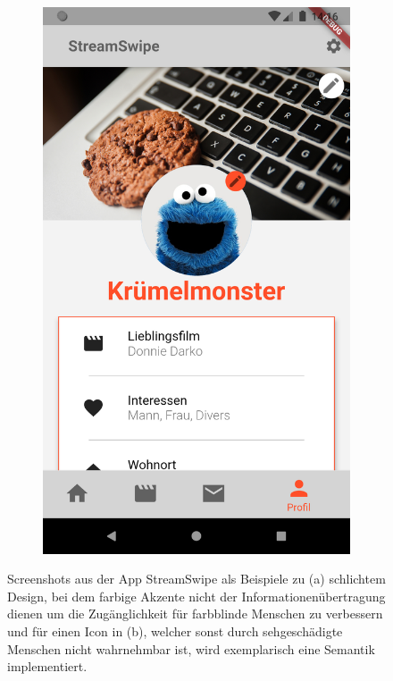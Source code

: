 \begin{figure}[tbt]
\begin{subfigure}{0.5\textwidth}
	\includegraphics[scale=0.15]{Barrierefreiheit/images/bsp-profil.png}
	\caption{}
	\label{fig:bf-beispiel_b}
	\end{subfigure}
\caption{Screenshots aus der App StreamSwipe als Beispiele zu (a) schlichtem Design, bei dem farbige Akzente nicht der Informationenübertragung dienen um die Zugänglichkeit für farbblinde Menschen zu verbessern und für einen Icon in (b), welcher sonst durch sehgeschädigte Menschen nicht wahrnehmbar ist, wird exemplarisch eine Semantik implementiert.}
\label{fig:BF-Beispiele}
\end{figure}


